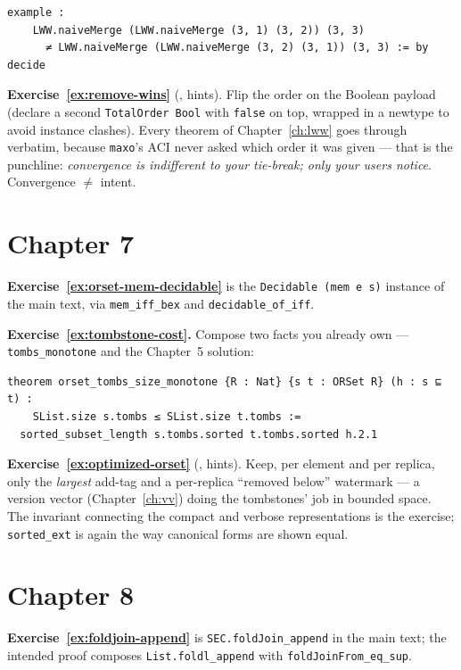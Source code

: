 \documentclass[12pt, a4paper, openright]{book}
\theoremstyle{thmstyle}
\theoremstyle{defstyle}
\newcommand{\lc}[1]{\texttt{#1}}
\newcounter{exercise}[chapter]
\begin{document}
\begin{verbatim}
example :
    LWW.naiveMerge (LWW.naiveMerge (3, 1) (3, 2)) (3, 3)
      ≠ LWW.naiveMerge (LWW.naiveMerge (3, 2) (3, 1)) (3, 3) := by decide
\end{verbatim}

\textbf{Exercise~\ref{ex:remove-wins}} (,
hints). Flip the order on the Boolean payload (declare a second
\lc{TotalOrder Bool} with \lc{false} on top, wrapped in a newtype to
avoid instance clashes). Every theorem of Chapter~\ref{ch:lww} goes
through verbatim, because \lc{maxo}'s ACI never asked which order it was
given --- that is the punchline: \emph{convergence is indifferent to
your tie-break; only your users notice}. Convergence $\ne$ intent.

\section*{Chapter 7}

\textbf{Exercise~\ref{ex:orset-mem-decidable}} is the
\lc{Decidable (mem e s)} instance of the main text, via
\lc{mem_iff_bex} and \lc{decidable_of_iff}.

\textbf{Exercise~\ref{ex:tombstone-cost}.} Compose two facts you
already own --- \lc{tombs_monotone} and the Chapter~5 solution:

\begin{verbatim}
theorem orset_tombs_size_monotone {R : Nat} {s t : ORSet R} (h : s ⊑ t) :
    SList.size s.tombs ≤ SList.size t.tombs :=
  sorted_subset_length s.tombs.sorted t.tombs.sorted h.2.1
\end{verbatim}

\textbf{Exercise~\ref{ex:optimized-orset}}
(, hints). Keep, per element and per replica,
only the \emph{largest} add-tag and a per-replica ``removed below''
watermark --- a version vector (Chapter~\ref{ch:vv}) doing the
tombstones' job in bounded space. The invariant connecting the compact
and verbose representations is the exercise; \lc{sorted_ext} is again
the way canonical forms are shown equal.

\section*{Chapter 8}

\textbf{Exercise~\ref{ex:foldjoin-append}} is
\lc{SEC.foldJoin_append} in the main text; the intended proof composes
\lc{List.foldl_append} with \lc{foldJoinFrom_eq_sup}.
\end{document}
